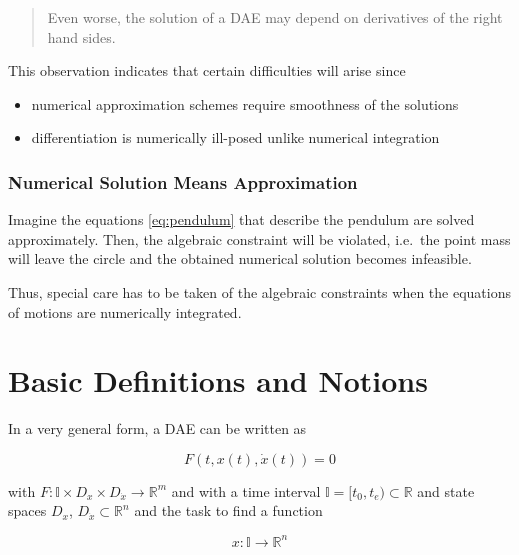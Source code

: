 \documentclass[]{book}
\providecommand{\tightlist}{%
  \setlength{\itemsep}{0pt}\setlength{\parskip}{0pt}}
\newenvironment {JHSAYS} [0] {\begin{quote}\color{jhsc}} {\end{quote}}
\theoremstyle{definition}
\theoremstyle{definition}
\theoremstyle{definition}
\theoremstyle{definition}
\theoremstyle{remark}
\begin{document}
\begin{JHSAYS}
Even worse, the solution of a DAE may depend on derivatives of the right
hand sides.
\end{JHSAYS}

This observation indicates that certain difficulties will arise since

\begin{itemize}
\tightlist
\item
  numerical approximation schemes require smoothness of the solutions
\item
  differentiation is numerically ill-posed unlike numerical integration
\end{itemize}

\hypertarget{numerical-solution-means-approximation}{%
\subsection*{Numerical Solution Means Approximation}\label{numerical-solution-means-approximation}}

Imagine the equations \eqref{eq:pendulum} that describe the pendulum are solved approximately. Then, the algebraic constraint will be violated, i.e.~the point mass will leave the circle and the obtained numerical solution becomes infeasible.

Thus, special care has to be taken of the algebraic constraints when the equations of motions are numerically integrated.

\hypertarget{basic-definitions-and-notions}{%
\chapter{Basic Definitions and Notions}\label{basic-definitions-and-notions}}

In a very general form, a DAE can be written as

\begin{equation}
    F(t, x(t), \dot x(t)) = 0
    \label{eq:gendae}
\end{equation}

with \(F\colon \mathbb I \times D_x \times D_{\dot x} \to \mathbb R^m\) and with a time interval \(\mathbb I=[t_0,t_e) \subset \mathbb R\) and state spaces \(D_x\), \(D_{\dot x} \subset \mathbb R^{n}\) and the task to find a function

\begin{equation*}
    x \colon \mathbb I \to \mathbb R^{n}
\end{equation*}
\end{document}
